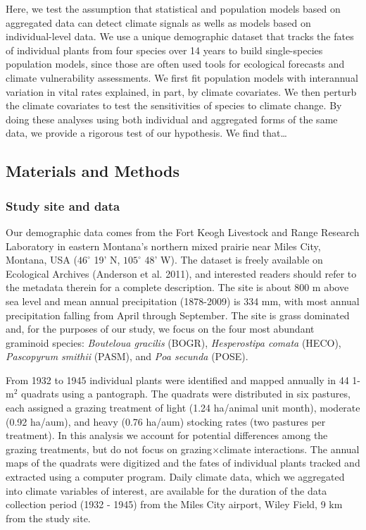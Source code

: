 \documentclass[12pt,]{article}
\begin{document}
Here, we test the assumption that statistical and population models
based on aggregated data can detect climate signals as wells as models
based on individual-level data. We use a unique demographic dataset that
tracks the fates of individual plants from four species over 14 years to
build single-species population models, since those are often used tools
for ecological forecasts and climate vulnerability assessments. We first
fit population models with interannual variation in vital rates
explained, in part, by climate covariates. We then perturb the climate
covariates to test the sensitivities of species to climate change. By
doing these analyses using both individual and aggregated forms of the
same data, we provide a rigorous test of our hypothesis. We find
that\ldots{}

\subsection{Materials and Methods}\label{materials-and-methods}

\subsubsection{Study site and data}\label{study-site-and-data}

Our demographic data comes from the Fort Keogh Livestock and Range
Research Laboratory in eastern Montana's northern mixed prairie near
Miles City, Montana, USA ($46^{\circ}$ 19' N, $105^{\circ}$ 48' W). The
dataset is freely available on Ecological Archives (Anderson et al.
2011), and interested readers should refer to the metadata therein for a
complete description. The site is about 800 m above sea level and mean
annual precipitation (1878-2009) is 334 mm, with most annual
precipitation falling from April through September. The site is grass
dominated and, for the purposes of our study, we focus on the four most
abundant graminoid species: \emph{Bouteloua gracilis} (BOGR),
\emph{Hesperostipa comata} (HECO), \emph{Pascopyrum smithii} (PASM), and
\emph{Poa secunda} (POSE).

From 1932 to 1945 individual plants were identified and mapped annually
in 44 1-$\text{m}^2$ quadrats using a pantograph. The quadrats were
distributed in six pastures, each assigned a grazing treatment of light
(1.24 ha/animal unit month), moderate (0.92 ha/aum), and heavy (0.76
ha/aum) stocking rates (two pastures per treatment). In this analysis we
account for potential differences among the grazing treatments, but do
not focus on grazing$\times$climate interactions. The annual maps of the
quadrats were digitized and the fates of individual plants tracked and
extracted using a computer program. Daily climate data, which we
aggregated into climate variables of interest, are available for the
duration of the data collection period (1932 - 1945) from the Miles City
airport, Wiley Field, 9 km from the study site.
\end{document}
